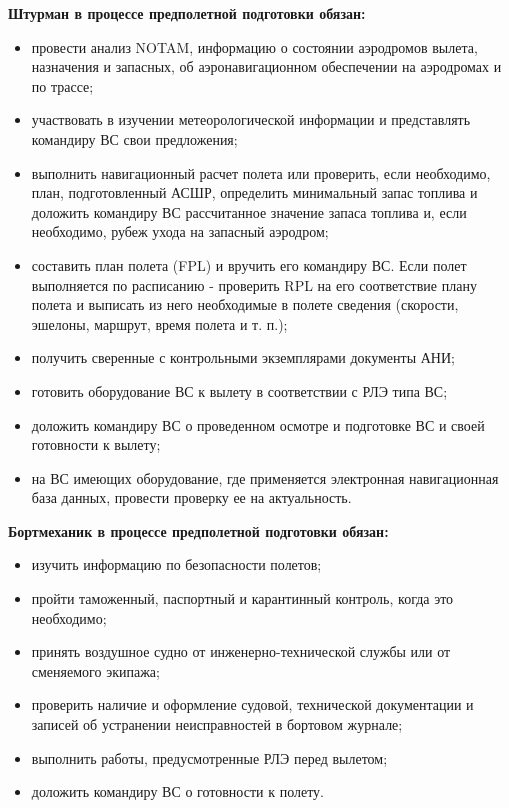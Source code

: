 \textbf{Штурман в процессе предполетной подготовки обязан:}
\begin{itemize}  
    \item	провести анализ NOTAM, информацию о состоянии аэродромов вылета, назначения и запасных, об аэронавигационном обеспечении на аэродромах и по трассе; 
    \item	участвовать в изучении метеорологической информации и представлять командиру ВС свои предложения;
    \item	выполнить навигационный расчет полета или проверить, если необходимо, план, подготовленный АСШР, определить минимальный запас топлива и доложить командиру ВС рассчитанное значение запаса топлива и, если необходимо, рубеж ухода на запасный аэродром;
    \item	составить план полета (FPL) и вручить его командиру ВС. Если полет выполняется по расписанию - проверить RPL на его соответствие плану полета и выписать из него необходимые в полете сведения (скорости, эшелоны, маршрут, время полета и т. п.);
    \item	получить сверенные с контрольными экземплярами документы АНИ;
    \item	готовить оборудование ВС к вылету в соответствии с РЛЭ типа ВС;
    \item	доложить командиру ВС о проведенном осмотре и подготовке ВС и своей готовности к вылету;
    \item	на ВС имеющих оборудование, где применяется электронная навигационная база данных, провести проверку ее на актуальность. 
\end{itemize}

\textbf{Бортмеханик в процессе предполетной подготовки обязан:}
\begin{itemize}
    \item	изучить информацию по безопасности полетов;
    \item	пройти таможенный, паспортный и карантинный контроль, когда это необходимо;
    \item	принять воздушное судно от инженерно-технической службы или от сменяемого экипажа;
    \item	проверить наличие и оформление судовой, технической документации и записей об устранении неисправностей в бортовом журнале;
    \item	выполнить работы, предусмотренные РЛЭ перед вылетом;
    \item	доложить командиру ВС о готовности к полету.
\end{itemize}

